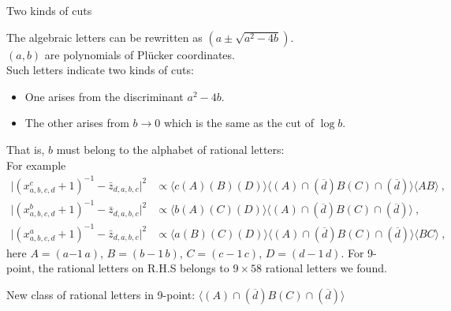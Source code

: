 \documentclass[10pt]{beamer}
\begin{document}
\begin{frame}{Two kinds of cuts}
  
  The algebraic letters can be rewritten as $(a\pm \sqrt{a^{2}-4b})$.\\
  $(a,b)$ are polynomials of Pl\"{u}cker coordinates. \\
  Such letters indicate two kinds of cuts:
  \begin{itemize}
    \item One arises from the discriminant $a^{2}-4b$.
    \item The other arises from $b\to0$ which is the same as the cut of $\log b$. 
  \end{itemize}
That is, $b$ must belong to the alphabet of \alert{rational letters}:\\
For example {\footnotesize{
\begin{equation*}
  \begin{aligned}
  \bigl|(x^{c}_{a,b,c,d}+1)^{-1}-\bar{z}_{d,a,b,c}\bigr|^{2}&\propto\langle c(A)(B)(D)\rangle\langle(A) \cap(\overline{d}) B(C) \cap(\overline{d})\rangle\langle A B\rangle \:,\\
  \bigl|(x^{b}_{a,b,c,d}+1)^{-1}-\bar{z}_{d,a,b,c}\bigr|^{2}&\propto \langle b(A)(C)(D)\rangle\langle(A) \cap(\overline{d}) B(C) \cap(\overline{d})\rangle \:, \\
  \bigl|(x^{a}_{a,b,c,d}+1)^{-1}-\bar{z}_{d,a,b,c}\bigr|^{2}&\propto \langle a(B)(C)(D)\rangle\langle(A) \cap(\overline{d}) B(C) \cap(\overline{d})\rangle\langle B C\rangle \:,
  \end{aligned} 
\end{equation*}
}}
here $A=(a{-1}\,a)$, $B=(b{-}1\,b)$, $C=(c{-}1\,c)$, $D=(d{-}1\,d)$. \newline
For 9-point, the rational letters on R.H.S belongs to $9\times 58$ rational letters we found.

New class of rational letters in 9-point: \alert{$
  \langle(A) \cap(\overline{d}) B(C) \cap(\overline{d})\rangle$
}
\end{frame}
\end{document}
